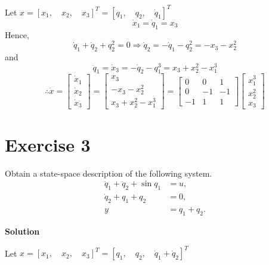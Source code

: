 \documentclass[12pt,a4paper]{article}
\begin{document}
Let $x = [x_1,\quad x_2,\quad x_3]^T = [q_1,\quad q_2,\quad \dot q_1]^T$
\[
	\dot x_1 =\dot q_1 = x_3
\]
Hence, 
\[
	\dot q_1 + \dot q_2 + q_2^2 = 0 \Rightarrow \dot q_2 = - \dot q_1 - q_2^2 = -x_3 - x_2^2 
\]
and
\[
	\ddot q_1 = \dot x_3 = -\dot q_2 - q_1^3 = x_3 + x_2^2 - x_1^3 
\]
\[
\therefore \dot x = \begin{bmatrix}
	\dot x_1 \\ \dot x_2 \\ \dot x_3
\end{bmatrix} = \begin{bmatrix}
	x_3 \\ -x_3 - x_2^2 \\ x_3 + x_2^2 - x_1^3 
\end{bmatrix} = \begin{bmatrix}
	0 & 0 & 1  \\
	0 & -1 & -1 \\
	-1 & 1 & 1
\end{bmatrix} \begin{bmatrix}
x_1^3 \\ x_2^2 \\ x_3
\end{bmatrix}
\]

\section*{Exercise 3}
Obtain a state-space description of the following system.
\[
\begin{aligned}
\ddot q_1+\ddot q_2+\sin q_1&=u,\\
\dot q_2+q_1+q_2&=0,\\
y&=q_1+q_2.
\end{aligned}
\]

\textbf{Solution}

Let $x = [x_1,\quad x_2,\quad x_3]^T = [q_1,\quad q_2,\quad  \dot q_1 + \dot q_2]^T$
\end{document}
